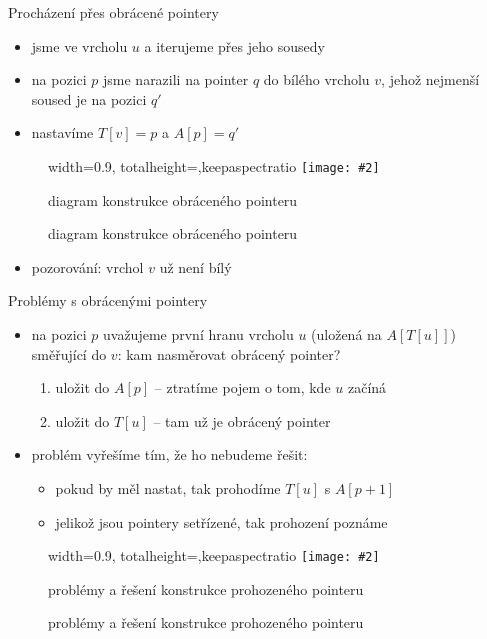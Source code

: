 \documentclass[czech]{beamer}
\makeatletter
\newcommand{\fitimage}[2][\@nil]{
	\begin{figure}
		\begin{adjustbox}{width=0.9\textwidth, totalheight=\textheight-2\baselineskip-2\baselineskip,keepaspectratio}
			\texttt{[image: \#2]}
		\end{adjustbox}
		\def\tmp{#1}%
	 \ifx\tmp\@nnil
			\else
			\caption{#1}
		\fi
	\end{figure}
}
\makeatother
\begin{document}
	\begin{frame}{Procházení přes obrácené pointery}
		\begin{itemize}
			\item jsme ve vrcholu $u$ a iterujeme přes jeho sousedy
			\item na pozici $p$ jsme narazili na pointer $q$ do bílého vrcholu $v$, jehož nejmenší soused je na pozici $q'$
			\item nastavíme $T[v] = p$ a $A[p] = q'$
		\end{itemize}
		\fitimage[diagram konstrukce obráceného pointeru]{images/deg2.png}
		\begin{itemize}
			\item pozorování: vrchol $v$ už není bílý
		\end{itemize}
	\end{frame}

	\begin{frame}{Problémy s obrácenými pointery}
		\begin{itemize}
			\item na pozici $p$ uvažujeme první hranu vrcholu $u$ (uložená na $A[T[u]]$) směřující do $v$: kam nasměrovat obrácený pointer?
			\begin{enumerate}
				\item uložit do $A[p]$ -- ztratíme pojem o tom, kde $u$ začíná
				\item uložit do $T[u]$ -- tam už je obrácený pointer
			\end{enumerate}
			\item problém vyřešíme tím, že ho nebudeme řešit:
			\begin{itemize}
				\item pokud by měl nastat, tak prohodíme $T[u]$ s $A[p + 1]$
				\item jelikož jsou pointery setřízené, tak prohození poznáme
			\end{itemize}
			\vfill
		\end{itemize}
		\fitimage[problémy a řešení konstrukce prohozeného pointeru]{images/reverse-pointer-problems.png}
	\end{frame}
\end{document}
